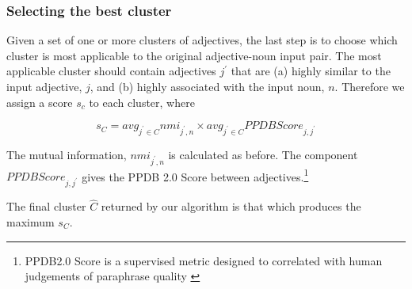 \documentclass[11pt,a4paper]{article}
\begin{document}
\subsubsection{Selecting the best cluster}

Given a set of one or more clusters of adjectives, the last step is to choose which cluster is most applicable to the original adjective-noun input pair. The most applicable cluster should contain adjectives $j^\prime$ that are (a) highly similar to the input adjective, $j$, and (b) highly associated with the input noun, $n$. Therefore we assign a score $s_c$ to each cluster, where

\[s_C = avg_{j^\prime \in C} nmi_{j^\prime,n} \times avg_{j^\prime \in C} PPDBScore_{j,j^\prime}\]

\noindent The mutual information, $nmi_{j^\prime, n}$ is calculated as before. The component $PPDBScore_{j,j^\prime}$ gives the PPDB 2.0 Score between adjectives.\footnote{PPDB2.0 Score is a supervised metric designed to correlated with human judgements of paraphrase quality \cite{pavlick-EtAl:2015:ACL-IJCNLP3}} 

The final cluster $\hat{C}$ returned by our algorithm is that which produces the maximum $s_C$.





\end{document}
